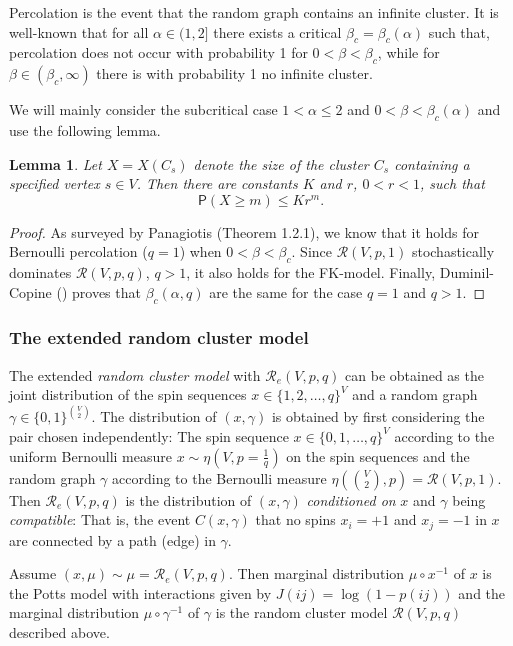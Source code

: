 \documentclass[11pt, a4paper]{amsart}
\newtheorem{lem}[thm]{Lemma}
\theoremstyle{definition}
\theoremstyle{remark}
\providecommand{\mscr}{\mathscr}
\renewcommand{\P}{\mathsf{P}}
\providecommand{\g}{\gamma}
\begin{document}
Percolation is the event that the random graph contains an infinite cluster. 
It is well-known \cite{ACCN} that for all $\alpha\in(1,2]$
there exists a critical $\beta_c=\beta_c(\alpha)$
such that, percolation does not occur with probability 1 for $0<\beta<\beta_c$, 
while for $\beta\in(\beta_c,\infty)$ there is with probability 1
no infinite cluster.     

We will mainly consider the subcritical case $1<\alpha\le 2$ and $0<\beta <\beta_c(\alpha)$ and use
the following lemma.
\begin{lem}\label{geometric-bound}
 Let $X=X(C_s)$ denote the size of the cluster $C_s$ 
 containing a specified vertex $s\in V$. Then there are constants 
 $K$ and $r$, $0<r<1$, such that $$\P(X\ge m)\le K r^{m}. $$ 
\end{lem}
\begin{proof}
  As surveyed by Panagiotis \cite{pan} (Theorem 1.2.1), we know that it
  holds for Bernoulli percolation ($q=1$) when $0<\beta<\beta_c$. Since $\mscr R(V,p,1)$
  stochastically dominates $\mscr R(V,p,q)$, $q>1$, it also holds for the
  FK-model. Finally, Duminil-Copine (\cite{duminil}) proves that $\beta_c(\alpha,q)$ are
  the same for the case $q=1$ and $q>1$.
\end{proof}

\subsubsection{The extended random cluster model}
The extended \emph{random cluster model} with $\mscr R_e(V,p,q)$ can be obtained
as the joint distribution of the spin sequences $x\in\{1,2,\dots,q\}^{V}$ and a
random graph $\gamma\in\{0,1\}^{\binom V2}$. The distribution of $(x,\gamma)$ is obtained by
first considering the pair chosen independently: The spin sequence
$x\in\{0,1,\dots,q\}^{V}$ according to the uniform Bernoulli measure
$x\sim\eta(V,p=\frac1q)$ on the spin sequences and the random graph $\gamma$ according to
the Bernoulli measure $\eta(\binom V2, p)=\mscr R(V,p,1)$. Then $\mscr R_e(V,p,q)$
is the distribution of $(x,\gamma)$ \emph{conditioned on} $x$ and $\gamma$ being
\emph{compatible}: That is, the event $C(x,\g)$ that no spins $x_i=+1$ and
$x_j=-1$ in $x$ are connected by a path (edge) in $\g$.

Assume $(x,\mu)\sim\mu=\mscr R_e(V,p,q)$. Then marginal distribution $\mu\circ x^{-1}$ of $x$
is the Potts model with interactions given by $J(ij)=\log(1-p(ij))$ and the
marginal distribution $\mu\circ\gamma^{-1}$ of $\gamma$ is the random cluster model
$\mscr R(V,p,q)$ described above.
\end{document}
